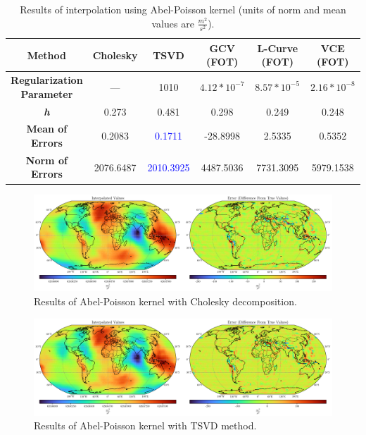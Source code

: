 \documentclass[12pt]{article}
\begin{document}
	\begin{table}[h!]
		\centering
		\caption{Results of interpolation using Abel-Poisson kernel (units of norm and mean values are $\frac{m^2}{s^2}$).}
		\vspace{0.2cm}
		\renewcommand{\arraystretch}{2}
		\begin{tabular}{c|c|c|c|c|c}
			\textbf{Method} & Cholesky & TSVD & GCV (FOT) & L-Curve (FOT) & VCE (FOT) \\
			\hline 
			\makecell{\textbf{Regularization} \\ \textbf{Parameter}} & --- & 1010 & $4.12*10^{-7}$ & $8.57*10^{-5}$ & $2.16*10^{-8}$ \\
			\hline 
			\textit{\textbf{h}} & 0.273 & 0.481 & 0.298 & 0.249 & 0.248 \\
			\hline
			\textbf{Mean of Errors} & 0.2083 & \textcolor{blue}{0.1711} & -28.8998 & 2.5335 & 0.5352 \\
			\hline 
			\textbf{Norm of Errors} & 2076.6487 & \textcolor{blue}{2010.3925} & 4487.5036 & 7731.3095 & 5979.1538 \\
		\end{tabular}
		\label{tab:Abel-Poisson_Results}
	\end{table}
	
	\begin{figure}[h!]
		\centering
		\includegraphics[width=16cm]{../Outputs/Plots/Plot_Abel-Poisson_Cholesky.pdf}
		\caption{Results of Abel-Poisson kernel with Cholesky decomposition.}
		\label{fig:Abel-Poisson_Chol}
	\end{figure}
	
	\begin{figure}[h!]
		\centering
		\includegraphics[width=16cm]{../Outputs/Plots/Plot_Abel-Poisson_TSVD.pdf}
		\caption{Results of Abel-Poisson kernel with TSVD method.}
		\label{fig:Abel-Poisson_TSVD}
	\end{figure}
	
\end{document}
